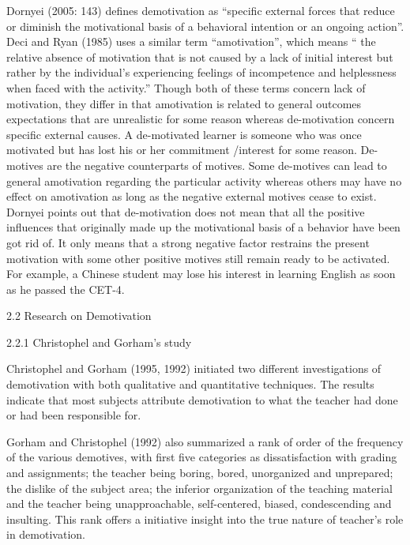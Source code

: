 
Dornyei (2005: 143) defines demotivation as “specific external forces that reduce or diminish the motivational basis of a behavioral intention or an ongoing action”. Deci and Ryan (1985) uses a similar term “amotivation”, which means “ the relative absence of motivation that is not caused by a lack of initial interest but rather by the individual’s experiencing feelings of incompetence and helplessness when faced with the activity.” Though both of these terms concern lack of motivation, they differ in that amotivation is related to general outcomes expectations that are unrealistic for some reason whereas de-motivation concern specific external causes. A de-motivated learner is someone who was once motivated but has lost his or her commitment /interest for some reason. De-motives are the negative counterparts of motives. Some de-motives can lead to general amotivation regarding the particular activity whereas others may have no effect on amotivation as long as the negative external motives cease to exist. Dornyei points out that de-motivation does not mean that all the positive influences that originally made up the motivational basis of a behavior have been got rid of. It only means that a strong negative factor restrains the present motivation with some other positive motives still remain ready to be activated. For example, a Chinese student may lose his interest in learning English as soon as he passed the CET-4.

2.2 Research on Demotivation

2.2.1 Christophel and Gorham’s study

Christophel and Gorham (1995, 1992) initiated two different investigations of demotivation with both qualitative and quantitative techniques.
The results indicate that most subjects attribute demotivation to what the teacher had done or had been responsible for.

Gorham and Christophel (1992) also summarized a rank of order of the frequency of the various demotives, with first five categories as dissatisfaction with grading and assignments; the teacher being boring, bored, unorganized and unprepared; the dislike of the subject area; the inferior organization of the teaching material and the teacher being unapproachable, self-centered, biased, condescending and insulting.
This rank offers a initiative insight into the true nature of teacher’s role in demotivation.





